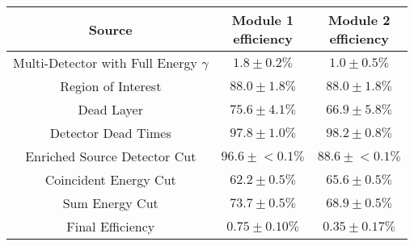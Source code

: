 \begin{tabular}{|c|c|c|}
\hline
  Source & \makecell{Module 1\\efficiency} & \makecell{Module 2\\efficiency} \\
\hline
  \makecell{Multi-Detector with\\Full Energy $\gamma$} & $1.8 \pm 0.2\%$ & $1.0 \pm 0.5\%$ \\
  Region of Interest & $88.0 \pm 1.8\%$ & $88.0 \pm 1.8\%$ \\
  Dead Layer & $75.6 \pm 4.1\%$ & $66.9 \pm 5.8\%$ \\
  Detector Dead Times & $97.8 \pm 1.0\%$ & $98.2 \pm 0.8\%$ \\
  Enriched Source Detector Cut & $96.6 \pm{}<\!0.1\%$ & $88.6 \pm{}<\!0.1\%$ \\
  Coincident Energy Cut & $62.2 \pm 0.5\%$ & $65.6 \pm 0.5\%$ \\
  Sum Energy Cut & $73.7 \pm 0.5\%$ & $68.9 \pm 0.5\%$ \\
  \hline Final Efficiency & $0.75 \pm 0.10\%$ & $0.35 \pm 0.17\%$ \\
\hline
\end{tabular}
